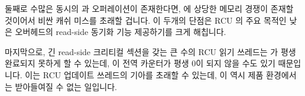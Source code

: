 둘째로 수많은 동시의  과 
오퍼레이션이 존재한다면,  에 상당한 메모리 경쟁이 존재할
것이어서 비싼 캐쉬 미스를 초래할 겁니다.
이 두개의 단점은 RCU 의 주요 목적인 낮은 오버헤드의 read-side 동기화 기능
제공하기를 크게 해칩니다.

마지막으로, 긴 read-side 크리티컬 섹션을 갖는 큰 수의 RCU 읽기 쓰레드는
 가 평생 완료되지 못하게 할 수 있는데, 이 전역 카운터가
평생 0이 되지 않을 수도 있기 때문입니다.
이는 RCU 업데이트 쓰레드의 기아를 초래할 수 있는데, 이 역시 제품 환경에서는
받아들여질 수 없는 일입니다.

\iffalse

Second, if there are many concurrent \co{rcu_read_lock()}
and \co{rcu_read_unlock()} operations, there will
be extreme memory contention on \co{rcu_refcnt},
resulting in expensive cache misses.
Both of these first two shortcomings largely defeat a major purpose of
RCU, namely to provide low-overhead read-side synchronization primitives.

Finally, a large number of RCU readers with long read-side
critical sections could prevent \co{synchronize_rcu()}
from ever completing, as the global counter might
never reach zero.
This could result in starvation of RCU updates, which
is of course unacceptable in production settings.

\fi

